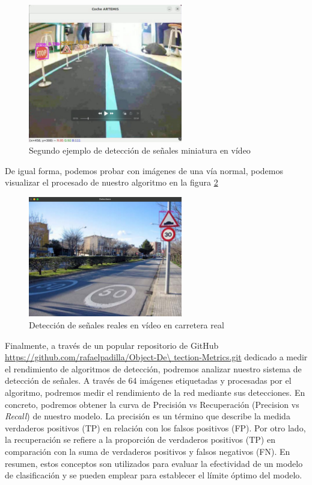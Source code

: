 \begin{figure}[H]
    \centering
 	\includegraphics[width=0.6\textwidth]{Imagenes/IA/deteccion2.pdf}
    \caption{Segundo ejemplo de detección de señales miniatura en vídeo}
    \label{deteccion2}
\end{figure}

De igual forma, podemos probar con imágenes de una vía normal, podemos visualizar el procesado de nuestro algoritmo en la figura \ref{deteccion3}\\

\begin{figure}[H]
    \centering
 	\includegraphics[width=0.6\textwidth]{Imagenes/IA/deteccion3.pdf}
    \caption{Detección de señales reales en vídeo en carretera real}
    \label{deteccion3}
\end{figure}

Finalmente, a través de un popular repositorio de GitHub \url{https://github.com/rafaelpadilla/Object-De\ tection-Metrics.git} dedicado a medir el rendimiento de algoritmos de detección, podremos analizar nuestro sistema de detección de señales. A través de 64 imágenes etiquetadas y procesadas por el algoritmo, podremos medir el rendimiento de la red mediante sus detecciones. En concreto, podremos obtener la curva de Precisión vs Recuperación (Precision vs \textit{Recall}) de nuestro modelo. La precisión es un término que describe la medida verdaderos positivos (TP) en relación con los falsos positivos (FP). Por otro lado, la recuperación se refiere a la proporción de verdaderos positivos (TP) en comparación con la suma de verdaderos positivos y falsos negativos (FN). En resumen, estos conceptos son utilizados para evaluar la efectividad de un modelo de clasificación y se pueden emplear para establecer el límite óptimo del modelo.\\

